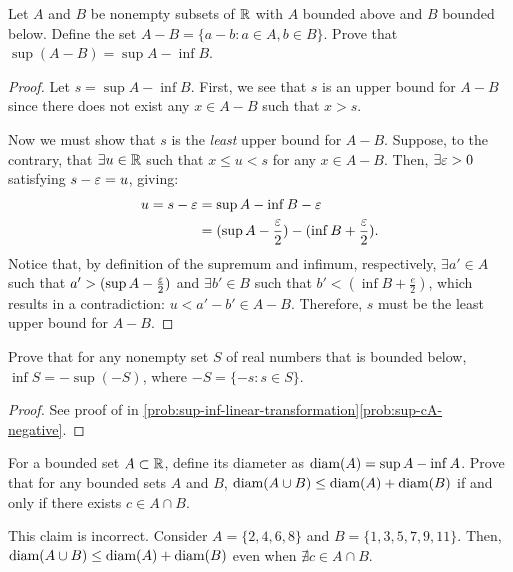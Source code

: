 \begin{problem}\label{prob:sup-A-minus-B}
  Let $A$ and $B$ be nonempty subsets of $\mathbb{R}$ with $A$ bounded above and $B$
  bounded below. Define the set $A - B = \{ a - b : a \in A, b \in B\}$.
  Prove that $\sup(A-B) = \sup A - \inf B$.
\end{problem}

\begin{proof}
  Let $s = \sup A - \inf B$. First, we see that $s$ is an upper bound
  for $A - B$ since there does not exist any $x \in A - B$ such that $x > s$.

  Now we must show that $s$ is the \textit{least} upper bound for $A - B$. Suppose,
  to the contrary, that $\exists u \in \mathbb{R}$ such that $x \leq u < s$ for any $x \in A - B$.
  Then, $\exists \varepsilon > 0$ satisfying $s - \varepsilon = u$, giving:
  \begin{align*}
    u = s - \varepsilon &= \sup A - \inf B - \varepsilon \\
                 &= (\sup A - \frac{\varepsilon}{2}) - (\inf B + \frac{\varepsilon}{2}). \\ 
  \end{align*}
  Notice that, by definition of the supremum and infimum, respectively,
  $\exists a' \in A$ such that $a' > (\sup A - \frac{\varepsilon}{2})$ and $\exists b'
  \in B$ such that $b' < (\inf B + \frac{e}{2})$, which results in a
  contradiction: $u < a' - b' \in A - B$. Therefore, $s$ must be the least
  upper bound for $A - B$.
\end{proof}

\begin{problem}
  Prove that for any nonempty set $S$ of real numbers that is bounded below,
  $\inf S = - \sup(-S)$, where $-S = \{ -s : s \in S\}$.
\end{problem}

\begin{proof}
  See proof of  in \ref{prob:sup-inf-linear-transformation}\ref{prob:sup-cA-negative}.
\end{proof}

\begin{problem}
  For a bounded set $A \subset \mathbb{R}$, define its diameter as $\text{diam}(A) = \sup A -
  \inf A$. Prove that for any bounded sets $A$ and $B$, $\text{diam}(A \cup B) \leq
  \text{diam}(A) + \text{diam}(B)$ if and only if there exists $c \in A \cap B$.
\end{problem}

\begin{callout}
  This claim is incorrect. Consider $A = \{2, 4, 6, 8\}$ and $B = \{1, 3, 5, 7, 9, 11 \}$.
  Then, $\text{diam}(A \cup B) \leq \text{diam}(A) + \text{diam}(B)$ even when $\nexists c \in A \cap B$. 
\end{callout}

